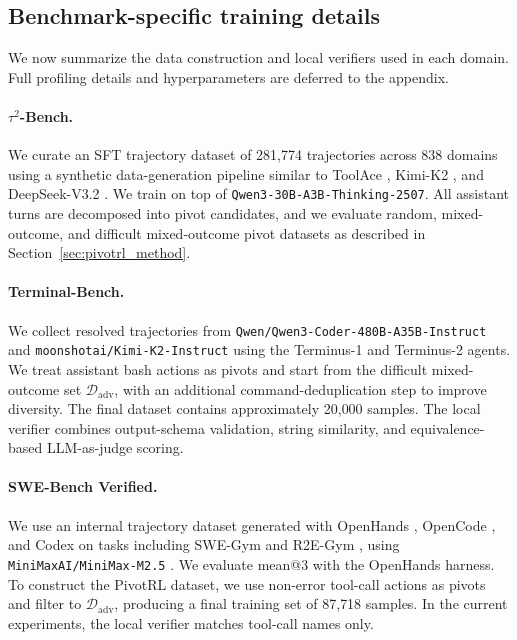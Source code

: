 \subsection{Benchmark-specific training details}
\label{sec:benchmark_specific_details}

We now summarize the data construction and local verifiers used in each domain. Full profiling details and hyperparameters are deferred to the appendix.

\paragraph{$\tau^2$-Bench.}
We curate an SFT trajectory dataset of 281{,}774 trajectories across 838 domains using a synthetic data-generation pipeline similar to ToolAce \citep{liu2025toolacewinningpointsllm}, Kimi-K2 \citep{kimiteam2025kimik2openagentic}, and DeepSeek-V3.2 \citep{deepseekai2025deepseekv32pushingfrontieropen}. We train on top of \texttt{Qwen3-30B-A3B-Thinking-2507}. All assistant turns are decomposed into pivot candidates, and we evaluate random, mixed-outcome, and difficult mixed-outcome pivot datasets as described in Section~\ref{sec:pivotrl_method}.

\paragraph{Terminal-Bench.}
We collect resolved trajectories from \texttt{Qwen/Qwen3-Coder-480B-A35B-Instruct} and \texttt{moonshotai/Kimi-K2-Instruct} using the Terminus-1 and Terminus-2 agents. We treat assistant bash actions as pivots and start from the difficult mixed-outcome set $\mathcal{D}_{\mathrm{adv}}$, with an additional command-deduplication step to improve diversity. The final dataset contains approximately 20{,}000 samples. The local verifier combines output-schema validation, string similarity, and equivalence-based LLM-as-judge scoring.

\paragraph{SWE-Bench Verified.}
We use an internal trajectory dataset generated with OpenHands \citep{wang2025openhandsopenplatformai}, OpenCode \citep{opencode}, and Codex \citep{openaicodex_software} on tasks including SWE-Gym \citep{pan2025trainingsoftwareengineeringagents} and R2E-Gym \citep{jain2025r2egymproceduralenvironmentshybrid}, using \texttt{MiniMaxAI/MiniMax-M2.5} \citep{minimax2026m25}. We evaluate mean@3 with the OpenHands harness. To construct the PivotRL dataset, we use non-error tool-call actions as pivots and filter to $\mathcal{D}_{\mathrm{adv}}$, producing a final training set of 87{,}718 samples. In the current experiments, the local verifier matches tool-call names only.

